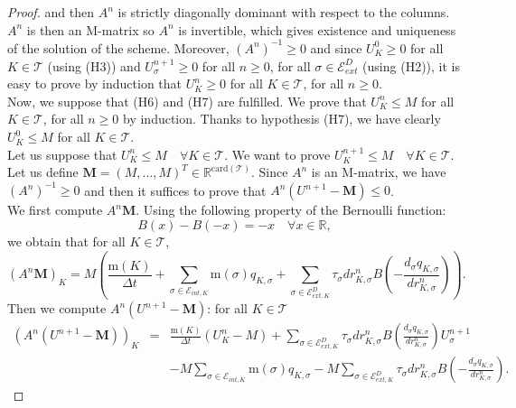 \documentclass[smallextended]{svjour3}
\begin{document}
\begin{proof}
and then $A^{n}$ is strictly diagonally dominant with respect to the columns. $A^{n}$ is then an M-matrix so $A^{n}$ is invertible, which gives existence and uniqueness of the solution of the scheme. Moreover, $(A^{n})^{-1}\geq 0$ and since $U_{K}^{0} \geq 0$ for all $K\in \mathcal{T}$ (using (H3)) and $U^{n+1}_{\sigma} \geq 0$ for all $n \geq 0$, for all $\sigma \in \mathcal{E}_{ext}^{D}$ (using (H2)), it is easy to prove by induction that $U^{n}_{K} \geq 0$ for all $K \in \mathcal{T}$, for all $n \geq 0$.\\
Now, we suppose that (H6) and (H7) are fulfilled. We prove that $U^{n}_{K}\leq M $ for all $K \in \mathcal{T}$, for all $n \geq 0$ by induction. Thanks to hypothesis (H7), we have clearly $U^{0}_{K}\leq M $ for all $ K \in \mathcal{T}$.\\
Let us suppose that $U^{n}_{K}\leq M \quad \forall K \in \mathcal{T}$. We want to prove $U^{n+1}_{K}\leq M \quad \forall K \in \mathcal{T}$.\\
Let us define $\textbf{M}=(M,...,M)^{T} \in \mathbb{R}^{\text{card}(\mathcal{T})}$. Since $A^{n}$ is an M-matrix, we have $(A^{n})^{-1} \geq 0$ and then it suffices to prove that $A^{n}\left(U^{n+1}-\textbf{M}\right) \leq 0$. \\
We first compute $A^{n}\textbf{M}$. Using the following property of the Bernoulli function:
\begin{equation}
B(x)-B(-x)=-x \quad \forall x \in \mathbb{R},
\label{propriB}
\end{equation}
we obtain that for all $K \in \mathcal{T}$,
\begin{equation*}
\left(A^{n}\textbf{M}\right)_{K}=M\left(\frac{\text{m}(K)}{\Delta t}+\sum_{\sigma \in \mathcal{E}_{int,K}}\text{m}(\sigma)q_{K,\sigma}+\sum_{\sigma \in \mathcal{E}_{ext,K}^{D}}\tau_{\sigma}dr^{n}_{K,\sigma}B\left(-\frac{d_{\sigma}q_{K,\sigma}}{dr^{n}_{K,\sigma}}\right)\right).
\end{equation*}
Then we compute $A^{n}\left(U^{n+1}-\textbf{M}\right)$: for all $K \in \mathcal{T}$
\begin{eqnarray*}
\left(A^{n}\left(U^{n+1}-\textbf{M}\right)\right)_{K} &=& \frac{\text{m}(K)}{\Delta t}(U^{n}_{K}-M)+ \sum_{\sigma \in \mathcal{E}_{ext,K}^{D}}\tau_{\sigma}dr^{n}_{K,\sigma}B\left(\frac{d_{\sigma}q_{K,\sigma}}{dr^{n}_{K,\sigma}}\right)U^{n+1}_{\sigma} \\
& & -M \sum_{\sigma \in \mathcal{E}_{int,K}}\text{m}(\sigma)q_{K,\sigma}-M\sum_{\sigma \in \mathcal{E}_{ext,K}^{D}}\tau_{\sigma}dr^{n}_{K,\sigma}B\left(-\frac{d_{\sigma}q_{K,\sigma}}{dr^{n}_{K,\sigma}}\right).

\end{eqnarray*}
\end{proof}
\end{document}
